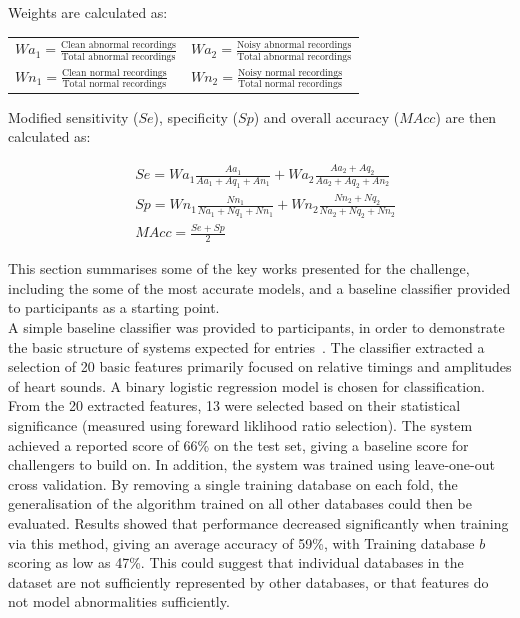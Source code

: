 \documentclass[titlepage, 12pt]{scrartcl} \usepackage{enumitem}
\begin{document}
Weights are calculated as:
\begin{table}[H]
\centering
\doublespacing
\begin{tabular}{ll}
$Wa_1 = \frac{\text{Clean abnormal recordings}}{\text{Total abnormal recordings}}$ & $Wa_2 = \frac{\text{Noisy abnormal recordings}}{\text{Total abnormal recordings}}$ \\
$Wn_1 = \frac{\text{Clean normal recordings}}{\text{Total normal recordings}}$     & $Wn_2 = \frac{\text{Noisy normal recordings}}{\text{Total normal recordings}}$    
\end{tabular}
\end{table}

Modified sensitivity ($Se$), specificity ($Sp$) and overall accuracy ($MAcc$) are then calculated as:

\begin{align*}
    &Se=Wa_1\frac{Aa_1}{Aa_1+Aq_1+An_1}+Wa_2\frac{Aa_2+Aq_2}{Aa_2+Aq_2+An_2} \\
    &Sp=Wn_1\frac{Nn_1}{Na_1+Nq_1+Nn_1}+Wn_2\frac{Nn_2+Nq_2}{Na_2+Nq_2+Nn_2} \\
    &MAcc=\frac{Se+Sp}{2}
\end{align*}

This section summarises some of the key works presented for the challenge,
including the some of the most accurate models, and a baseline classifier
provided to participants as a starting point.\\

A simple baseline classifier was provided to participants, in order to
demonstrate the basic structure of systems expected for
entries~\parencite{Liu2016}. The classifier extracted a selection of 20 basic
features primarily focused on relative timings and amplitudes of heart sounds.
A binary logistic regression model is chosen for classification. From the 20
extracted features, 13 were selected based on their statistical significance
(measured using foreward liklihood ratio selection). The system achieved a
reported score of 66\% on the test set, giving a baseline score for challengers to build on.
In addition, the system was trained using leave-one-out cross validation. By
removing a single training database on each fold, the generalisation of the algorithm
trained on all other databases could then be evaluated. Results showed that
performance decreased significantly when training via this method, giving an
average accuracy of 59\%, with Training database $b$ scoring as low as 47\%.
This could suggest that individual databases in the dataset are not sufficiently
represented by other databases, or that features do not model abnormalities
sufficiently.\\
\end{document}

